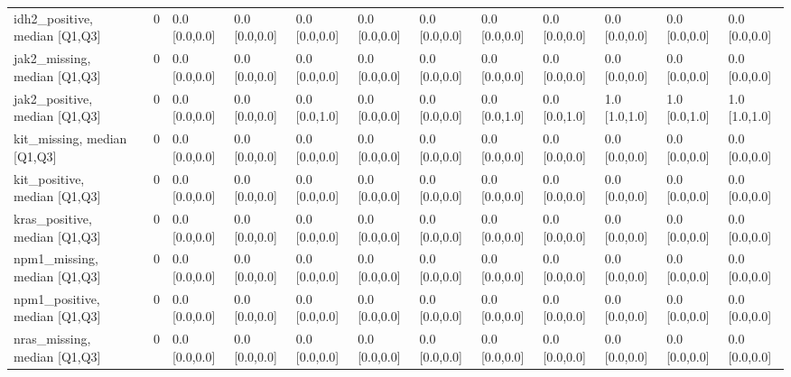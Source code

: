 \begin{tabular}{lllllllllllll}
idh2\_positive, median [Q1,Q3] &    &                    0 &       0.0 [0.0,0.0] &      0.0 [0.0,0.0] &        0.0 [0.0,0.0] &       0.0 [0.0,0.0] &     0.0 [0.0,0.0] &     0.0 [0.0,0.0] &     0.0 [0.0,0.0] &        0.0 [0.0,0.0] &       0.0 [0.0,0.0] &        0.0 [0.0,0.0] \\
jak2\_missing, median [Q1,Q3] &    &                    0 &       0.0 [0.0,0.0] &      0.0 [0.0,0.0] &        0.0 [0.0,0.0] &       0.0 [0.0,0.0] &     0.0 [0.0,0.0] &     0.0 [0.0,0.0] &     0.0 [0.0,0.0] &        0.0 [0.0,0.0] &       0.0 [0.0,0.0] &        0.0 [0.0,0.0] \\
jak2\_positive, median [Q1,Q3] &    &                    0 &       0.0 [0.0,0.0] &      0.0 [0.0,0.0] &        0.0 [0.0,1.0] &       0.0 [0.0,0.0] &     0.0 [0.0,0.0] &     0.0 [0.0,1.0] &     0.0 [0.0,1.0] &        1.0 [1.0,1.0] &       1.0 [0.0,1.0] &        1.0 [1.0,1.0] \\
kit\_missing, median [Q1,Q3] &    &                    0 &       0.0 [0.0,0.0] &      0.0 [0.0,0.0] &        0.0 [0.0,0.0] &       0.0 [0.0,0.0] &     0.0 [0.0,0.0] &     0.0 [0.0,0.0] &     0.0 [0.0,0.0] &        0.0 [0.0,0.0] &       0.0 [0.0,0.0] &        0.0 [0.0,0.0] \\
kit\_positive, median [Q1,Q3] &    &                    0 &       0.0 [0.0,0.0] &      0.0 [0.0,0.0] &        0.0 [0.0,0.0] &       0.0 [0.0,0.0] &     0.0 [0.0,0.0] &     0.0 [0.0,0.0] &     0.0 [0.0,0.0] &        0.0 [0.0,0.0] &       0.0 [0.0,0.0] &        0.0 [0.0,0.0] \\
kras\_positive, median [Q1,Q3] &    &                    0 &       0.0 [0.0,0.0] &      0.0 [0.0,0.0] &        0.0 [0.0,0.0] &       0.0 [0.0,0.0] &     0.0 [0.0,0.0] &     0.0 [0.0,0.0] &     0.0 [0.0,0.0] &        0.0 [0.0,0.0] &       0.0 [0.0,0.0] &        0.0 [0.0,0.0] \\
npm1\_missing, median [Q1,Q3] &    &                    0 &       0.0 [0.0,0.0] &      0.0 [0.0,0.0] &        0.0 [0.0,0.0] &       0.0 [0.0,0.0] &     0.0 [0.0,0.0] &     0.0 [0.0,0.0] &     0.0 [0.0,0.0] &        0.0 [0.0,0.0] &       0.0 [0.0,0.0] &        0.0 [0.0,0.0] \\
npm1\_positive, median [Q1,Q3] &    &                    0 &       0.0 [0.0,0.0] &      0.0 [0.0,0.0] &        0.0 [0.0,0.0] &       0.0 [0.0,0.0] &     0.0 [0.0,0.0] &     0.0 [0.0,0.0] &     0.0 [0.0,0.0] &        0.0 [0.0,0.0] &       0.0 [0.0,0.0] &        0.0 [0.0,0.0] \\
nras\_missing, median [Q1,Q3] &    &                    0 &       0.0 [0.0,0.0] &      0.0 [0.0,0.0] &        0.0 [0.0,0.0] &       0.0 [0.0,0.0] &     0.0 [0.0,0.0] &     0.0 [0.0,0.0] &     0.0 [0.0,0.0] &        0.0 [0.0,0.0] &       0.0 [0.0,0.0] &        0.0 [0.0,0.0] \\

\end{tabular}

